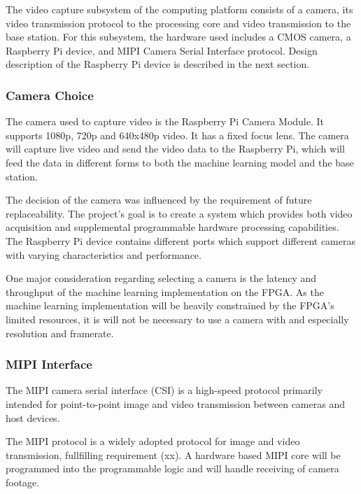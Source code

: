 
The video capture subsystem of the computing platform consists of a camera, its video transmission protocol to the processing core and video transmission to the base station. For this subsystem, the hardware used includes a CMOS camera, a Raspberry Pi device, and MIPI Camera Serial Interface protocol. Design description of the Raspberry Pi device is described in the next section.

\subsubsection{Camera Choice}
The camera used to capture video is the Raspberry Pi Camera Module. It supports 1080p, 720p and 640x480p video. It has a fixed focus lens. The camera will capture live video and send the video data to the Raspberry Pi, which will feed the data in different forms to both the machine learning model and the base station.

The decision of the camera was influenced by the requirement of future replaceability. The project's goal is to create a system which provides both video acquisition and supplemental programmable hardware processing capabilities. The Raspberry Pi device contains different ports which support different cameras with varying characteristics and performance.

One major consideration regarding selecting a camera is the latency and throughput of the machine learning implementation on the FPGA. As the machine learning implementation will be heavily constrained by the FPGA's limited resources, it is will not be necessary to use a camera with and especially resolution and framerate.

\subsubsection{MIPI Interface}
The MIPI camera serial interface (CSI) is a high-speed protocol primarily intended for point-to-point image and video transmission between cameras and host devices. 

The MIPI protocol is a widely adopted protocol for image and video transmission, fullfilling requirement (xx). A hardware based MIPI core will be programmed into the programmable logic and will handle receiving of camera footage.

